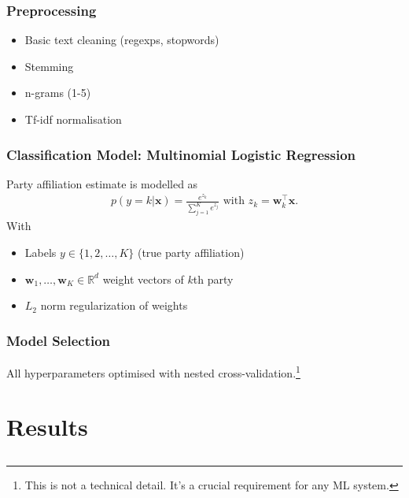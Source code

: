 \documentclass[]{beamer}
\newcommand{\R}{\ensuremath{\mathds{R}}}
\renewcommand{\vec}[1]{\mathbf{#1}}
\begin{document}
\begin{frame}\frametitle{Preprocessing}
\begin{itemize}
\item Basic text cleaning (regexps, stopwords)
\item Stemming
\item n-grams (1-5)
\item Tf-idf normalisation
\end{itemize}
\end{frame}

\begin{frame}\frametitle{Classification Model: Multinomial Logistic Regression}
Party affiliation estimate is modelled as
\begin{eqnarray}\label{eq:logreg_multiclass}
p(y=k|\vec{x}) = \frac{e^{z_k}}{\sum_{j=1}^K e^{z_j}}  \textrm{ with }  z_k=\vec{w}_k^{\top}\vec{x}.
\end{eqnarray}
With
\begin{itemize}
\item Labels $y\in\{1,2,\dots,K\}$ (true party affiliation)\\ 
\item $\vec{w}_1,\dots,\vec{w}_K\in\R^{d}$ weight vectors of $k$th party\\ 
\item $L_2$ norm regularization of weights
\end{itemize}
\end{frame}

\begin{frame}\frametitle{Model Selection}
\begin{block}{}
\centering
All hyperparameters optimised with nested cross-validation.\footnote{This is not a technical detail. It's a crucial requirement for any ML system.}
\end{block}
\end{frame}

\section{Results}
\subsection{}
\end{document}
